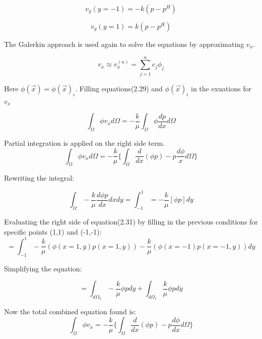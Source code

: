 \documentclass[a4paper]{report}
\begin{document}
\begin{equation}
v_y(y=-1)=-k(p-p^H)
\end{equation}


\begin{equation}
v_y(y=1)=k(p-p^H)
\end{equation}

The Galerkin approach is used again to solve the equations by approximating $v_x$.

\begin{equation}
v_x \approx v^{(n)}_x=\sum_{j=1}^{n}c_j \phi_j
\end{equation}

Here $\phi(\vec{x})=\phi (\vec{x})_i$. Filling equations(2.29) and $\phi(\vec{x})_i$ in the exuations for $v_x$ 


\begin{equation}
\int_{\Omega}\phi v_x d\Omega=-\frac{k}{\mu}\int_{\Omega}\phi\frac{dp}{dx}d\Omega
\end{equation}

Partial integration is applied on the right side term.
\begin{equation}
\int_{\Omega}\phi v_x d\Omega=  -\frac{k}{\mu}\{\int_{\Omega}\frac{d}{dx}(\phi p)-p\frac{d\phi}{x}d\Omega\}
\end{equation}

Rewriting the integral:

\begin{equation}
 \int_{\Omega}-\frac{k}{\mu}\frac{d\phi p}{dx}dxdy=\int_{-1}^{1}=-\frac{k}{\mu}[\phi p]dy
\end{equation}

Evaluating the right side of equation(2.31) by filling in the previous conditions for specific points (1,1) and (-1,-1):
\begin{equation}
=\int_{-1}^{1}-\frac{k}{\mu}(\phi(x=1,y)p(x=1,y))-\frac{k}{\mu}(\phi(x=-1)p(x=-1,y))dy
\end{equation}

Simplifying the equation:

\begin{equation}
=\int_{d\Omega_3}-\frac{k}{\mu}\phi pdy+\int_{d\Omega_1}\frac{k}{\mu}\phi pdy
\end{equation}

Now the total combined equation found is:
\begin{equation}
\int_{\Omega}\phi v_x = -\frac{k}{\mu}\{\int_{\Omega}\frac{d}{dx}(\phi p)-p\frac{d\phi}{dx}d\Omega\}
\end{equation}
\end{document}
